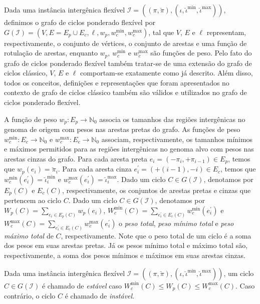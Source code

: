 Dada uma instância intergênica flexível $\mathcal{I} = ((\pi,\breve\pi),(\iota,\breve\iota^{\min},\breve\iota^{\max}))$, definimos o grafo de ciclos ponderado flexível por $G(\mathcal{I}) = (V, E=E_p \cup E_c, \ell, w_p, w^{\min}_c, w^{\max}_c)$, tal que $V$, $E$ e $\ell$ representam, respectivamente, o conjunto de vértices, o conjunto de arestas e uma função de rotulação de arestas, enquanto $w_p$, $w^{\min}_c$ e $w^{\max}_c$ são funções de peso. Pelo fato do grafo de ciclos ponderado flexível também tratar-se de uma extensão do grafo de ciclos clássico, $V$, $E$ e $\ell$ comportam-se exatamente como já descrito. Além disso, todos os conceitos, definições e representações que foram apresentados no contexto de grafo de ciclos clássico também são válidos e utilizados no grafo de ciclos ponderado flexível.

A função de peso $w_p : E_p \rightarrow \mathbb{N}_0$ associa os tamanhos das regiões intergênicas no genoma de origem com pesos nas arestas pretas do grafo. As funções de peso $w^{\min}_c : E_c \rightarrow \mathbb{N}_0$ e $w^{\max}_c : E_c \rightarrow \mathbb{N}_0$ associam, respectivamente, os tamanhos mínimos e máximos permitidos para as regiões intergênicas no genoma alvo com pesos nas arestas cinzas do grafo. Para cada aresta preta $e_i = (-\pi_i, +\pi_{i-1}) \in E_p$, temos que $w_p(e_i) = \breve\pi_i$. Para cada aresta cinza $e^{\prime}_i = (+(i-1), -i) \in E_c$, temos que $w^{\min}_c(e^{\prime}_i) = \breve\iota^{\min}_i$ e $w^{\max}_c(e^{\prime}_i) = \breve\iota^{\max}_i$. Dado um ciclo $C \in G(\mathcal{I})$, denotamos por $E_p(C)$ e $E_c(C)$, respectivamente, os conjuntos de arestas pretas e cinzas que pertencem ao ciclo $C$. Dado um ciclo $C \in G(\mathcal{I})$, denotamos por $W_p(C)=\sum_{e_i \in E_p(C)} w_p(e_i)$, $W^{\min}_c(C)=\sum_{e^{\prime}_i \in E_c(C)} w^{\min}_c(e^{\prime}_i)$ e $W^{\max}_c(C)=\sum_{e^{\prime}_i \in E_c(C)} w^{\max}_c(e^{\prime}_i)$ o \emph{peso total}, \emph{peso mínimo total} e \emph{peso máximo total} de $C$, respectivamente. Note que o peso total de um ciclo é a soma dos pesos em suas arestas pretas. Já os pesos mínimo total e máximo total são, respectivamente, a soma dos pesos mínimos e máximos em suas arestas cinzas. 

\begin{definition}
Dada uma instância intergênica flexível $\mathcal{I} = ((\pi,\breve\pi),(\iota,\breve\iota^{\min},\breve\iota^{\max}))$, um ciclo $C \in G(\mathcal{I})$ é chamado de \emph{estável} caso $W^{\min}_c(C) \le W_p(C) \le W^{\max}_c(C)$. Caso contrário, o ciclo $C$ é chamado de \emph{instável}.
\end{definition}

